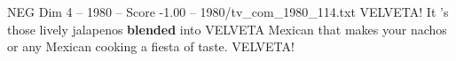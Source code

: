 \begin{textsample}{NEG Dim 4 – 1980 – Score -1.00 – 1980/tv\_com\_1980\_114.txt}  \label{ex:f4_neg_037}
VELVETA!
It 's those lively jalapenos \textbf{blended} into VELVETA Mexican that makes your nachos or any Mexican cooking a fiesta of taste.
VELVETA!

\end{textsample}
